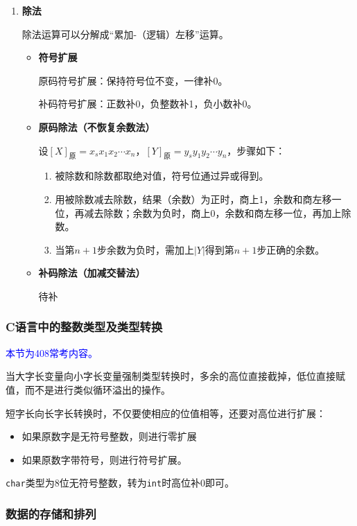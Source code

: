 \documentclass[12pt, a4paper, oneside]{ctexart}
\begin{document}
\begin{enumerate}
  \item {\bf 除法}
  
  除法运算可以分解成“累加-（逻辑）左移”运算。
  
  \begin{itemize}
    \item {\bf 符号扩展}
    
    原码符号扩展：保持符号位不变，一律补0。

    补码符号扩展：正数补0，负整数补1，负小数补0。

    \item {\bf 原码除法（不恢复余数法）}
    
    设$[X]_\text{原}=x_s x_1 x_2\cdots x_n$，$[Y]_\text{原}=y_s y_1 y_2\cdots y_n$，步骤如下：
    \begin{enumerate}
      \item 被除数和除数都取绝对值，符号位通过异或得到。
      \item 用被除数减去除数，结果（余数）为正时，商上1，余数和商左移一位，再减去除数；余数为负时，商上0，余数和商左移一位，再加上除数。
      \item 当第$n+1$步余数为负时，需加上$|Y|$得到第$n+1$步正确的余数。
    \end{enumerate}
    \item {\bf 补码除法（加减交替法）}
    
    待补
  \end{itemize}
\end{enumerate}

\subsubsection{C语言中的整数类型及类型转换}

\textcolor{blue}{本节为408常考内容。}

当大字长变量向小字长变量强制类型转换时，多余的高位直接截掉，低位直接赋值，而不是进行类似循环溢出的操作。

短字长向长字长转换时，不仅要使相应的位值相等，还要对高位进行扩展：
\begin{itemize}
  \item 如果原数字是无符号整数，则进行零扩展
  \item 如果原数字带符号，则进行符号扩展。
\end{itemize}

\verb|char|类型为8位无符号整数，转为\verb|int|时高位补0即可。

\subsubsection{数据的存储和排列}
\end{document}
